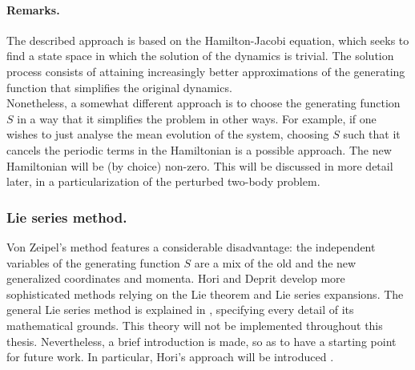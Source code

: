 		\paragraph{Remarks. \\}
		\indent The described approach is based on the Hamilton-Jacobi equation, which seeks to find a state space in which the solution of the dynamics is trivial. The solution process consists of attaining increasingly better approximations of the generating function that simplifies the original dynamics. \\
		\indent Nonetheless, a somewhat different approach is to choose the generating function $S$ in a way that it simplifies the problem in other ways. For example, if one wishes to just analyse the mean evolution of the system, choosing $S$ such that it cancels the periodic terms in the Hamiltonian is a possible approach. The new Hamiltonian will be (by choice) non-zero. This will be discussed in more detail later, in a particularization of the perturbed two-body problem.
		\subsubsection{Lie series method.}
		\indent Von Zeipel's method features a considerable disadvantage: the independent variables of the generating function $S$ are a mix of the old and the new generalized coordinates and momenta. Hori \cite{Hori} and Deprit \cite{Deprit, Deprit_2} develop more sophisticated methods relying on the Lie theorem and Lie series expansions. The general Lie series method is explained in \cite{Nayfeh}, specifying every detail of its mathematical grounds. This theory will not be implemented throughout this thesis. Nevertheless, a brief introduction is made, so as to have a starting point for future work. In particular, Hori's approach will be introduced \cite{SCFormationFlying}.
